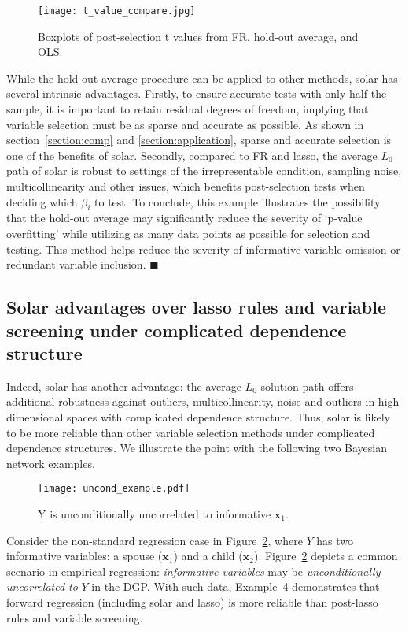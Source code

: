 \documentclass[12pt]{article}
\begin{document}
\begin{figure}[h]
%
  \centering
%
  \texttt{[image: t\_value\_compare.jpg]}
%
  \caption{Boxplots of post-selection t values from FR, hold-out average, and OLS.}
%
  \label{fig:t_value_compare}
%
\end{figure}

While the hold-out average procedure can be applied to other methods, solar has several intrinsic advantages. Firstly, to ensure accurate tests with only half the sample, it is important to retain residual degrees of freedom, implying that variable selection must be as sparse and accurate as possible. As shown in section~\ref{section:comp} and \ref{section:application}, sparse and accurate selection is one of the benefits of solar. Secondly, compared to FR and lasso, the average $L_0$ path of solar is robust to settings of the irrepresentable condition, sampling noise, multicollinearity and other issues, which benefits post-selection tests when deciding which $\beta_i$ to test. To conclude, this example illustrates the possibility that the hold-out average may significantly reduce the severity of `p-value overfitting' while utilizing as many data points as possible for selection and testing. This method helps reduce the severity of informative variable omission or redundant variable inclusion. $\blacksquare$

\subsection{Solar advantages over lasso rules and variable screening under complicated dependence structure \label{section:example}}

Indeed, solar has another advantage: the average $L_0$ solution path offers additional robustness against outliers, multicollinearity, noise and outliers in high-dimensional spaces with complicated dependence structure. Thus, solar is likely to be more reliable than other variable selection methods under complicated dependence structures. We illustrate the point with the following two Bayesian network examples.

\begin{figure}[h]
%
  \centering
  \texttt{[image: uncond\_example.pdf]}
  \caption{Y is unconditionally uncorrelated to informative $\mathbf{x}_1$.}
  \label{fig:uncond_example}
%
\end{figure}

Consider the non-standard regression case in Figure~\ref{fig:uncond_example}, where $Y$ has two informative variables: a spouse ($\mathbf{x}_1$) and a child ($\mathbf{x}_2$). Figure~\ref{fig:uncond_example} depicts a common scenario in empirical regression: \emph{informative variables} may be \emph{unconditionally uncorrelated to} $Y$ in the DGP. With such data, Example~4 demonstrates that forward regression (including solar and lasso) is more reliable than post-lasso rules and variable screening.
\end{document}
